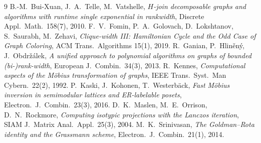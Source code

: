 \documentclass[11pt]{article}
\begin{document}
\begin{thebibliography}{9}
 B.-M.~Bui-Xuan, J.~A.~Telle, M.~Vatshelle, \emph{$H$-join decomposable graphs and
algorithms with runtime single exponential in rankwidth}, Discrete Appl.\ Math.\ 158(7), 2010.
 F.~V.~Fomin, P.~A.~Golovach, D.~Lokshtanov, S.~Saurabh, M.~Zehavi,
\emph{Clique-width III: Hamiltonian Cycle and the Odd Case of Graph Coloring},
ACM Trans.\ Algorithms 15(1), 2019.
 R.~Ganian, P.~Hlin\v{e}n\'y, J.~Obdr\v{z}\'alek, \emph{A unified approach to
polynomial algorithms on graphs of bounded (bi-)rank-width}, European J.\ Combin.\ 34(3), 2013.
 R.~Kennes, \emph{Computational aspects of the M\"obius transformation of graphs},
IEEE Trans.\ Syst.\ Man Cybern.\ 22(2), 1992.
 P.~Kaski, J.~Kohonen, T.~Westerb\"ack, \emph{Fast M\"obius inversion in semimodular
lattices and ER-labelable posets}, Electron.\ J.\ Combin.\ 23(3), 2016.
 D.~K.~Maslen, M.~E.~Orrison, D.~N.~Rockmore, \emph{Computing isotypic projections
with the Lanczos iteration}, SIAM J.\ Matrix Anal.\ Appl.\ 25(3), 2004.
 M.~K.~Srinivasan, \emph{The Goldman--Rota identity and the Grassmann scheme},
Electron.\ J.\ Combin.\ 21(1), 2014.
\end{thebibliography}
\end{document}
